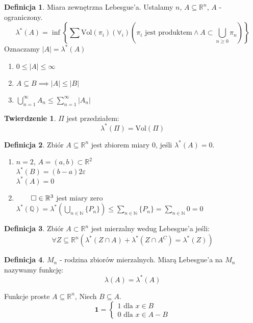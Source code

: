 \documentclass{article}
\theoremstyle{definition}
\newtheorem{de}{Definicja}[subsection]
\theoremstyle{definition}
\newtheorem{tw}{Twierdzenie}[subsection]
\theoremstyle{definition}
\theoremstyle{definition}
\theoremstyle{definition}
\theoremstyle{definition}
\theoremstyle{definition}
\begin{document}
\begin{de}
    Miara zewnętrzna Lebesgue'a. Ustalamy $n$, $A\subseteq \mathbb{R}^n$, $A$ - ograniczony.
    \[\lambda^{*}(A) = \inf \left\{\sum \text{Vol}(\pi_i) \left(\forall_i \right)(\pi_i \text{ jest produktem} \land A\subset \bigcup_{n\geq 0} \pi_n)\right\}\]
    Oznaczamy $|A|=\lambda^{*}(A)$
\end{de}

\begin{enumerate}
    \item $0 \leq |A| \leq \infty$
    \item $A\subseteq B \implies |A| \leq |B|$
    \item $\bigcup_{n=1}^{\infty} A_n \leq \sum_{n=1}^{\infty} |A_n|$
\end{enumerate}

\begin{tw}
    $\Pi$ jest przedziałem:
    \[\lambda^{*}(\Pi) = \text{Vol}(\Pi)\]
\end{tw}

\begin{de}
    Zbiór $A\subseteq \mathbb{R}^n$ jest zbiorem miary 0, jeśli $\lambda^{*}(A)=0$.
    \begin{enumerate}
        \item $n=2$, $A = (a,b) \subset \mathbb{R}^2$\\
        $\lambda^{*}(B)=(b-a)2\varepsilon$\\
        $\lambda^{*}(A)=0$
        \item $\qed\in \mathbb{R}^3$ jest miary zero\\
        $\lambda^{*}(\mathbb{Q})=\lambda^{*}(\bigcup_{n\in\mathbb{N}} \{P_n\}) \leq \sum_{n\in\mathbb{N}} \{P_n\} = \sum_{n\in\mathbb{N}} 0 = 0$
    \end{enumerate}
\end{de}

\begin{de}
    Zbiór $A\subset \mathbb{R}^n$ jest mierzalny wedug Lebesgue'a jeśli:
    \[\forall Z\subseteq \mathbb{R}^n \left(\lambda^{*}(Z\cap A) + \lambda^{*}(Z\cap A^C) = \lambda^{*}(Z)\right)\]
\end{de}

\begin{de}
    $M_n$ - rodzina zbiorów mierzalnych. Miarą Lebesgue'a na $M_n$ nazywamy funkcję:
    \[\lambda(A) = \lambda^{*}(A)\]
\end{de}
Funkcje proste $A\subseteq \mathbb{R}^n$, Niech $B\subseteq A$.
\[
\textbf{1} =
\begin{cases}
    1 \text{ dla } x\in B\\
    0 \text{ dla } x\in A-B
\end{cases}
\]
\end{document}
